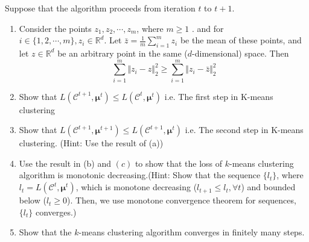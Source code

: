 \documentclass{article}
\begin{document}
Suppose that the algorithm proceeds from iteration $t$ to $t+1$.
\begin{enumerate}
    \item Consider the points $z_1, z_2, \cdots, z_m$, where $m\geq 1$ . and for $i\in\{1, 2, \cdots, m\}, z_i\in \mathbb{R}^d$. Let $\bar{z} = \frac{1}{m}\sum_{i=1}^m z_i$ be the mean of these points, and let $z\in \mathbb{R}^d$ be an arbitrary point in the same ($d$-dimensional) space. Then
    $$
    \sum_{i=1}^m \Vert z_i - z\Vert^2_2 \geq \sum_{i=1}^m \Vert z_i - \bar{z}\Vert^2_2
    $$
    \item Show that $L(\mathcal{C}^{t+1}, \boldsymbol{\mu}^{t}) \leq L(\mathcal{C}^{t}, \boldsymbol{\mu}^{t})$ i.e. The first step in K-means clustering

    \item Show that $L(\mathcal{C}^{t+1}, \boldsymbol{\mu}^{t+1})\leq L(\mathcal{C}^{t+1}, \boldsymbol{\mu}^{t})$ i.e. The second step in K-means clustering. (Hint: Use the result of (a))

    \item Use the result in (b) and $(c)$ to show that the loss of $k$-means clustering algorithm is monotonic decreasing.(Hint: Show that the sequence $\{l_t\}$, where $l_t = L(\mathcal{C}^{t}, \boldsymbol{\mu}^{t})$, which is monotone decreasing ($l_{t+1}\leq l_t, \forall t$) and bounded below ($l_t\geq 0$). Then, we use monotone convergence theorem for sequences, $\{l_t\}$ converges.)

    \item Show that the $k$-means clustering algorithm converges in finitely many steps.
\end{enumerate}
\end{document}
